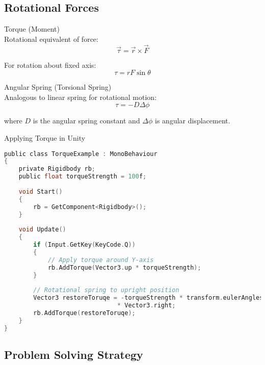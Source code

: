 \subsection{Rotational Forces}

\begin{definition}{Torque (Moment)}\\
    Rotational equivalent of force:
    $$\vec{\tau} = \vec{r} \times \vec{F}$$
    
    For rotation about fixed axis:
    $$\tau = rF\sin\theta$$
\end{definition}

\begin{definition}{Angular Spring (Torsional Spring)}\\
    Analogous to linear spring for rotational motion:
    $$\tau = -D\Delta\phi$$
    
    where $D$ is the angular spring constant and $\Delta\phi$ is angular displacement.
\end{definition}

\begin{code}{Applying Torque in Unity}\\
\begin{lstlisting}[language=C, style=basesmol]
public class TorqueExample : MonoBehaviour 
{
    private Rigidbody rb;
    public float torqueStrength = 100f;
    
    void Start() 
    {
        rb = GetComponent<Rigidbody>();
    }
    
    void Update() 
    {
        if (Input.GetKey(KeyCode.Q)) 
        {
            // Apply torque around Y-axis
            rb.AddTorque(Vector3.up * torqueStrength);
        }
        
        // Rotational spring to upright position
        Vector3 restoreToruqe = -torqueStrength * transform.eulerAngles.x 
                               * Vector3.right;
        rb.AddTorque(restoreToruqe);
    }
}
\end{lstlisting}
\end{code}

\subsection{Problem Solving Strategy}

